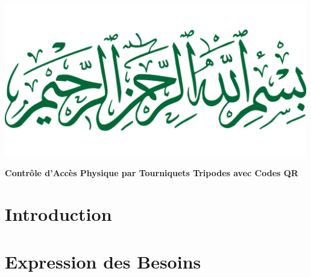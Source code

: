 \documentclass[12pt, a4paper]{report}
\begin{document}
	
	
	\newpage
	\begin{center}
		\vspace*{\fill}
		\vspace*{\fill}
		\includegraphics[width=500px]{images/bismillah.png}
		\vspace*{\fill}
		\vspace*{\fill}
	\end{center}
	\newpage
	\begin{center}
		\vspace*{\fill}
		\vspace*{\fill}
		{\Huge\bfseries Contrôle d'Accès Physique par Tourniquets Tripodes avec Codes QR\par}
		\vspace*{\fill}
		\vspace*{\fill}
	\end{center}
	
	

	\tableofcontents

	
	\chapter{Introduction}
	
	\pagebreak
	
	\chapter{Expression des Besoins}
	
	
	
	\pagebreak
\end{document}

